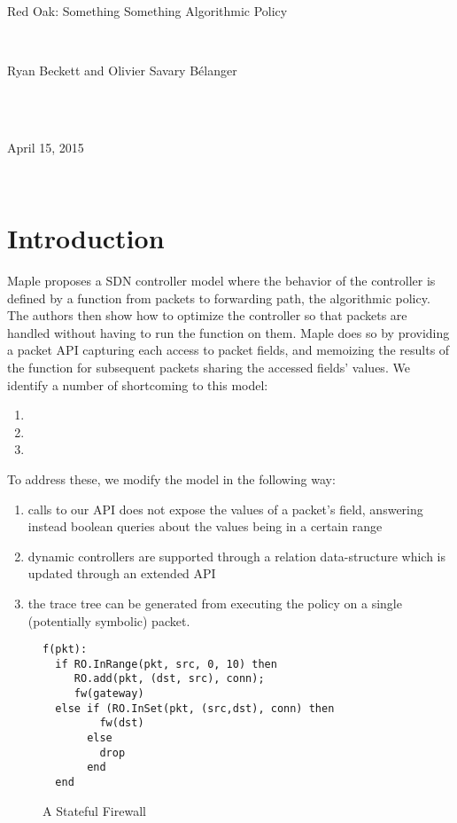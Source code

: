 \documentclass[12pt]{article}
\begin{document}
\quad \\
\quad \\
\quad \\
\centerline{ \large{Red Oak: Something Something Algorithmic Policy}}
\vspace{1pt}\\
\centerline{Ryan Beckett and Olivier Savary B\'{e}langer} \\
\\
\centerline{April 15, 2015} \\


\section*{Introduction}
Maple \cite{Maple} proposes a SDN controller model where the behavior of the controller is defined by a function from packets to forwarding path, the algorithmic policy. The authors then show how to optimize the controller so that packets are handled without having to run the function on them. Maple does so by providing a packet API capturing each access to packet fields, and memoizing the results of the function for subsequent packets sharing the accessed fields' values. We identify a number of shortcoming to this model:
\begin{enumerate}
\item %
  \item %
  \item %
\end{enumerate}

To address these, we modify the model in the following way:
\begin{enumerate}
  \item calls to our API does not expose the values of a packet's field, answering instead boolean queries about the values being in a certain range
  \item dynamic controllers are supported through a relation data-structure which is updated through an extended API
  \item the trace tree can be generated from executing the policy on a single (potentially symbolic) packet.
\end{enumerate}





\begin{figure}
\begin{lstlisting}
f(pkt):
  if RO.InRange(pkt, src, 0, 10) then
     RO.add(pkt, (dst, src), conn);
     fw(gateway)
  else if (RO.InSet(pkt, (src,dst), conn) then
         fw(dst)   
       else
         drop
       end
  end                
  \end{lstlisting}

\caption{A Stateful Firewall}
\end{figure}
\end{document}
